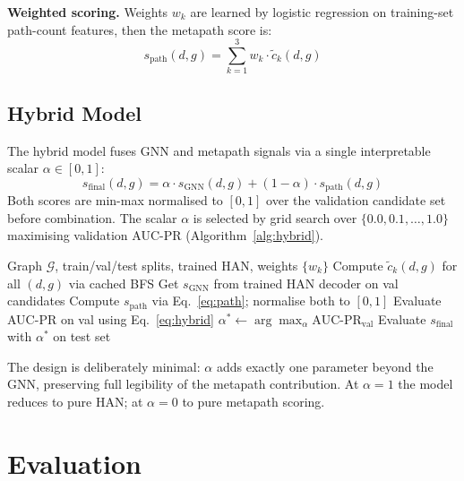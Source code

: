\documentclass[10pt,a4paper,twocolumn]{article}
\newcommand{\Gcal}{\mathcal{G}}
\begin{document}
\textbf{Weighted scoring.} Weights $w_k$ are learned by logistic regression on
training-set path-count features, then the metapath score is:
\begin{equation}
s_{\text{path}}(d,g) = \sum_{k=1}^{3} w_k \cdot \tilde{c}_k(d,g)
\label{eq:path}
\end{equation}

\subsection{Hybrid Model}

The hybrid model fuses GNN and metapath signals via a single interpretable
scalar $\alpha \in [0,1]$:
\begin{equation}
\boxed{s_{\text{final}}(d,g) = \alpha \cdot s_{\text{GNN}}(d,g) + (1-\alpha)\cdot s_{\text{path}}(d,g)}
\label{eq:hybrid}
\end{equation}
Both scores are min-max normalised to $[0,1]$ over the validation candidate
set before combination. The scalar $\alpha$ is selected by grid search over
$\{0.0, 0.1, \ldots, 1.0\}$ maximising validation AUC-PR (Algorithm~\ref{alg:hybrid}).

\begin{algorithm}[H]
\caption{Hybrid Scoring Pipeline}
\label{alg:hybrid}
\small
\begin{algorithmic}[1]
\Require Graph $\Gcal$, train/val/test splits, trained HAN, weights $\{w_k\}$
\State Compute $\tilde{c}_k(d,g)$ for all $(d,g)$ via cached BFS
\State Get $s_{\text{GNN}}$ from trained HAN decoder on val candidates
\State Compute $s_{\text{path}}$ via Eq.~\eqref{eq:path}; normalise both to $[0,1]$
  \State Evaluate AUC-PR on val using Eq.~\eqref{eq:hybrid}
\EndFor
\State $\alpha^* \leftarrow \arg\max_\alpha \text{AUC-PR}_{\text{val}}$
\State Evaluate $s_{\text{final}}$ with $\alpha^*$ on test set
\end{algorithmic}
\end{algorithm}

The design is deliberately minimal: $\alpha$ adds exactly one parameter beyond
the GNN, preserving full legibility of the metapath contribution. At $\alpha=1$
the model reduces to pure HAN; at $\alpha=0$ to pure metapath scoring.

\section{Evaluation}
\label{sec:eval}
\end{document}
